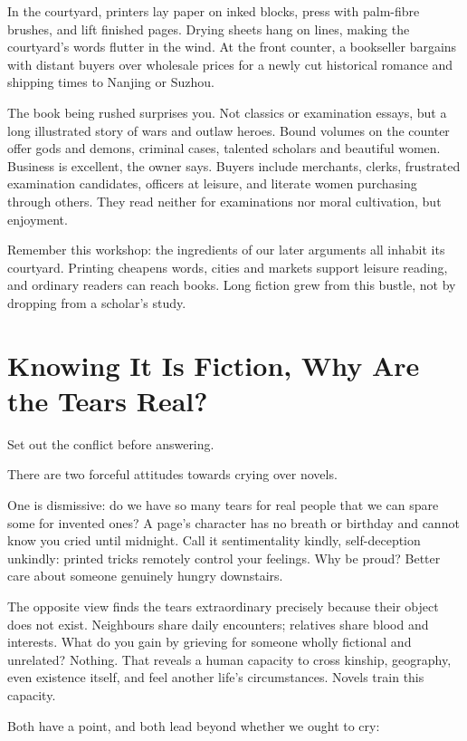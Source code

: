 In the courtyard, printers lay paper on inked blocks, press with palm-fibre brushes, and lift finished pages. Drying sheets hang on lines, making the courtyard's words flutter in the wind. At the front counter, a bookseller bargains with distant buyers over wholesale prices for a newly cut historical romance and shipping times to Nanjing or Suzhou.

The book being rushed surprises you. Not classics or examination essays, but a long illustrated story of wars and outlaw heroes. Bound volumes on the counter offer gods and demons, criminal cases, talented scholars and beautiful women. Business is excellent, the owner says. Buyers include merchants, clerks, frustrated examination candidates, officers at leisure, and literate women purchasing through others. They read neither for examinations nor moral cultivation, but enjoyment.

Remember this workshop: the ingredients of our later arguments all inhabit its courtyard. Printing cheapens words, cities and markets support leisure reading, and ordinary readers can reach books. Long fiction grew from this bustle, not by dropping from a scholar's study.

\section[Fictional Events, Real Tears]{Knowing It Is Fiction, Why Are the Tears Real?}
Set out the conflict before answering.

There are two forceful attitudes towards crying over novels.

One is dismissive: do we have so many tears for real people that we can spare some for invented ones? A page's character has no breath or birthday and cannot know you cried until midnight. Call it sentimentality kindly, self-deception unkindly: printed tricks remotely control your feelings. Why be proud? Better care about someone genuinely hungry downstairs.

The opposite view finds the tears extraordinary precisely because their object does not exist. Neighbours share daily encounters; relatives share blood and interests. What do you gain by grieving for someone wholly fictional and unrelated? Nothing. That reveals a human capacity to cross kinship, geography, even existence itself, and feel another life's circumstances. Novels train this capacity.

Both have a point, and both lead beyond whether we ought to cry:

